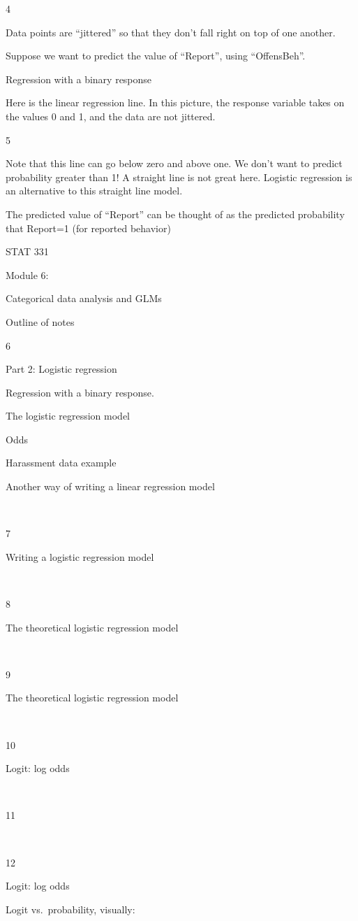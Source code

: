 \documentclass[
  letterpaper,
  DIV=11,
  numbers=noendperiod]{scrreprt}
\begin{document}
4

Data points are ``jittered'' so that they don't fall right on top of one
another.

Suppose we want to predict the value of ``Report'', using ``OffensBeh''.

Regression with a binary response

Here is the linear regression line. In this picture, the response
variable takes on the values 0 and 1, and the data are not jittered.

5

Note that this line can go below zero and above one. We don't want to
predict probability greater than 1! A straight line is not great here.
Logistic regression is an alternative to this straight line model.

The predicted value of ``Report'' can be thought of as the predicted
probability that Report=1 (for reported behavior)

STAT 331

Module 6:

Categorical data analysis and GLMs

Outline of notes

6

Part 2: Logistic regression

Regression with a binary response.

The logistic regression model

Odds

Harassment data example

Another way of writing a linear regression model

~

7

Writing a logistic regression model

~

8

The theoretical logistic regression model

~

9

The theoretical logistic regression model

~

10

Logit: log odds

~

11

~

12

Logit: log odds

Logit vs.~probability, visually:
\end{document}
